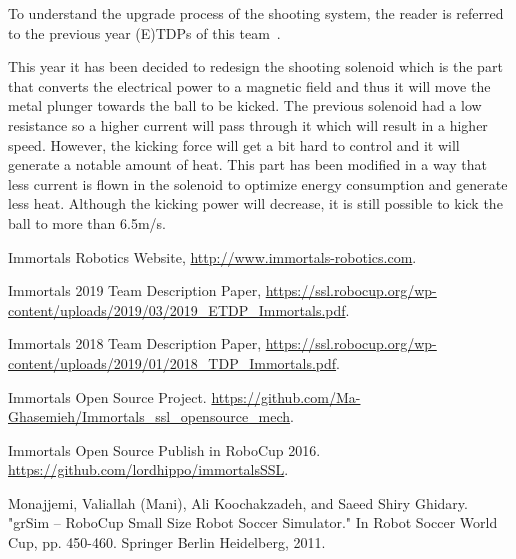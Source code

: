 \documentclass[runningheads]{llncs}
\begin{document}
To understand the upgrade process of the shooting system, the reader is referred to the previous year (E)TDPs of this team~\cite{ref_ETDP2019,ref_ETDP2018}.

This year it has been decided to redesign the shooting solenoid which is the part that converts the electrical power to a magnetic field and thus it will move the metal plunger towards the ball to be kicked. The previous solenoid had a low resistance so a higher current will pass through it which will result in a higher speed. However, the kicking force will get a bit hard to control and it will generate a notable amount of heat. This part has been modified in a way that less current is flown in the solenoid to optimize energy consumption and generate less heat. Although the kicking power will decrease, it is still possible to kick the ball to more than 6.5m/s.






\newpage
\begin{thebibliography}{8}
Immortals Robotics Website, \url{http://www.immortals-robotics.com}.

Immortals 2019 Team Description Paper, \url{https://ssl.robocup.org/wp-content/uploads/2019/03/2019\_ETDP\_Immortals.pdf}.

Immortals 2018 Team Description Paper, \url{https://ssl.robocup.org/wp-content/uploads/2019/01/2018\_TDP\_Immortals.pdf}.

Immortals Open Source Project. \url{https://github.com/Ma-Ghasemieh/Immortals\_ssl\_opensource\_mech}.

Immortals Open Source Publish in RoboCup 2016. \url{https://github.com/lordhippo/immortalsSSL}.

Monajjemi, Valiallah (Mani), Ali Koochakzadeh, and Saeed Shiry Ghidary. "grSim – RoboCup Small Size Robot Soccer Simulator." In Robot Soccer World Cup, pp. 450-460. Springer Berlin Heidelberg, 2011.

\end{thebibliography}
\end{document}
